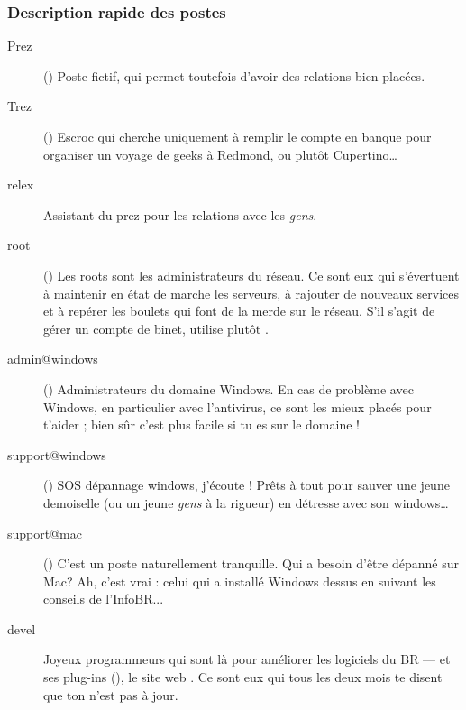 
\subsubsection*{Description rapide des postes}

\begin{description}

  \item[Prez]{() Poste fictif, qui permet toutefois d'avoir
des relations bien plac\'ees.}

  \item[Trez]{() Escroc qui cherche uniquement \`a remplir le compte en banque pour organiser un voyage de geeks \`a Redmond, ou plut\^ot Cupertino\dots}

  \item[relex]{Assistant du prez pour les relations avec les \emph{gens}.}

  \item[root]{() Les roots sont les administrateurs du r\'eseau. Ce sont eux qui s'\'evertuent \`a maintenir en \'etat de marche les serveurs, \`a rajouter de nouveaux services et \`a rep\'erer les boulets qui font de la merde sur le r\'eseau. S'il s'agit de g\'erer un compte de binet, utilise plut\^ot .}

  \item[admin@windows] {() Administrateurs du domaine Windows. En cas de probl\`eme avec Windows, en particulier avec l'antivirus, ce sont les mieux plac\'es pour t'aider ; bien s\^ur c'est plus facile si tu es sur le domaine !
}
  \item[support@windows] {() SOS d\'epannage windows, j'\'ecoute ! Pr\^ets \`a tout pour sauver une jeune demoiselle (ou un jeune \emph{gens} \`a la rigueur) en d\'etresse avec son windows\dots }

  \item[support@mac] {() C'est un poste naturellement tranquille. Qui a besoin d'\^etre d\'epann\'e sur Mac? Ah, c'est vrai : celui qui a install\'e Windows dessus en suivant les conseils de l'InfoBR... }

  \item[devel]{Joyeux programmeurs qui sont l\`a pour am\'eliorer les logiciels du BR ---  et ses plug-ins (), le site web . Ce sont eux qui tous les deux mois te disent que ton  n'est pas \`a jour.}


\end{description}

